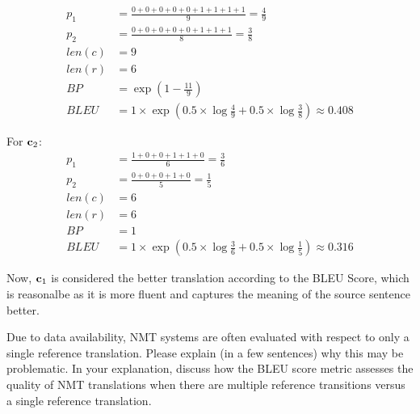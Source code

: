 \begin{parts}
\begin{subparts}
{            \begin{align*}
            p_1 &= \frac{0 + 0 + 0 + 0 + 0 + 1 + 1 + 1 + 1}{9} = \frac{4}{9} \\
            p_2 &= \frac{0 + 0 + 0 + 0 + 0 + 1 + 1 + 1}{8} = \frac{3}{8} \\
            len(c) &= 9 \\
            len(r) &= 6 \\
            BP &= \exp(1-\frac{11}{9}) \\
            BLEU &= 1 \times \exp(0.5 \times \log{\frac{4}{9}} + 0.5 \times \log{\frac{3}{8}}) \approx 0.408
            \end{align*}

            For $\mathbf{c}_2$:
            \begin{align*}
            p_1 &= \frac{1 + 0 + 0 + 1 + 1 + 0}{6} = \frac{3}{6} \\
            p_2 &= \frac{0 + 0 + 0 + 1 + 0}{5} = \frac{1}{5} \\
            len(c) &= 6 \\
            len(r) &= 6 \\
            BP &= 1 \\
            BLEU &= 1 \times \exp(0.5 \times \log{\frac{3}{6}} + 0.5 \times \log{\frac{1}{5}}) \approx 0.316
            \end{align*}

            Now, $\mathbf{c}_1$ is considered the better translation according to the BLEU Score, which is reasonalbe as it is more fluent and captures the meaning of the source sentence better.
        }
        
        
        
        \subpart[2] Due to data availability, NMT systems are often evaluated with respect to only a single reference translation. Please explain (in a few sentences) why this may be problematic. In your explanation, discuss how the BLEU score metric assesses the quality of NMT translations when there are multiple reference transitions versus a single reference translation.

        

\end{subparts}
\end{parts}
